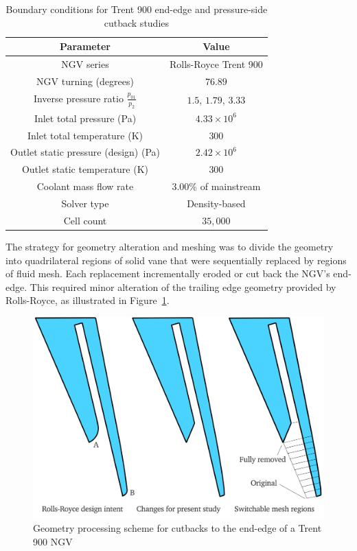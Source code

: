 \documentclass[a4paper, 11pt, oneside]{report}
\begin{document}
\begin{table}[H]
\caption{Boundary conditions for Trent 900 end-edge and pressure-side cutback studies}
\label{ss_cutbacks_parameters}
\begin{center}
\begin{tabular}{|c|c|}
\hline
Parameter & Value\\
\hline
NGV series & Rolls-Royce Trent 900\\
NGV turning (degrees) & $76.89$\\
Inverse pressure ratio $\frac{p_{01}}{p_2}$ & $1.5$, $1.79$, $3.33$\\
Inlet total pressure (Pa) & $4.33 \times 10^6$\\
Inlet total temperature (K) & $300$\\
Outlet static pressure (design) (Pa) & $2.42 \times 10^6$\\
Outlet static temperature (K) & $300$\\
Coolant mass flow rate & $3.00\%$ of mainstream \\
Solver type & Density-based\\
Cell count & $35,000$\\
\hline
\end{tabular}
\end{center}
\end{table}

The strategy for geometry alteration and meshing was to divide the geometry into quadrilateral regions of solid vane that were sequentially replaced by regions of fluid mesh. Each replacement incrementally eroded or cut back the NGV's end-edge. This required minor alteration of the trailing edge geometry provided by Rolls-Royce, as illustrated in Figure~\ref{fig:T900_ss_cutbacks_geometry}.

\begin{figure}[H]
      \centering
      \includegraphics[width=.9\textwidth]{figs/T900_ss_cutbacks_geometry.png}
      \caption{Geometry processing scheme for cutbacks to the end-edge of a Trent 900 NGV}
      \label{fig:T900_ss_cutbacks_geometry}
\end{figure}
\end{document}
